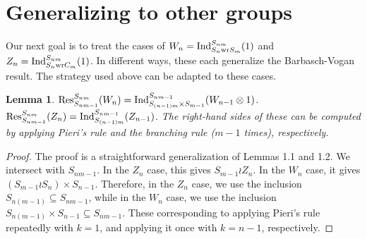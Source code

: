 \documentclass[12pt]{amsart}
\theoremstyle{plain}
\newtheorem{lemma}[theorem]{Lemma}
\theoremstyle{definition}
\theoremstyle{remark}
\newcommand{\Ind}{\textup{Ind}}
\newcommand{\Res}{\textup{Res}}
\newcommand{\wreath}{\textup{wr}}
\begin{document}
\section{Generalizing to other groups}
Our next goal is to treat the cases of $W_n = \Ind_{S_n \wreath S_m}^{S_{nm}}(1)$ and $Z_n = \Ind_{S_n \wreath C_m}^{S_{nm}}(1)$. In different ways, these each generalize the Barbasch-Vogan result. The strategy used above can be adapted to these cases.

\begin{lemma}
$\Res_{S_{nm-1}}^{S_{nm}}(W_n) = \Ind_{S_{(n-1)m} \times S_{m-1}}^{S_{nm-1}}(W_{n-1} \otimes 1)$.
$\Res_{S_{nm-1}}^{S_{nm}}(Z_n) = \Ind_{S_{(n-1)m} }^{S_{nm-1}}(Z_{n-1})$. 
The right-hand sides of these can be computed by applying Pieri's rule and the branching rule ($m-1$ times), respectively.
\end{lemma}
\begin{proof}
The proof is a straightforward generalization of Lemmas 1.1 and 1.2.
We intersect with $S_{nm-1}$. In the $Z_n$ case, this gives $S_{m-1} \wr Z_n$. 
In the $W_n$ case, it gives $(S_{m-1} \wr S_n) \times S_{n-1}$.
Therefore, in the $Z_n$ case, we use the inclusion $S_{n(m-1)} \subseteq S_{nm-1}$, while in the $W_n$ case, we use the inclusion $S_{n(m-1)} \times S_{n-1} 
\subseteq S_{nm-1}$. These corresponding to applying Pieri's rule repeatedly
with $k=1$, and applying it once with $k=n-1$, respectively.
\end{proof}
\end{document}
